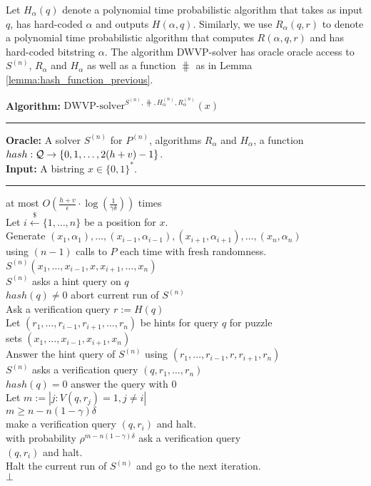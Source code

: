 Let $H_{\alpha}(q)$ denote a polynomial time probabilistic algorithm that takes as input $q$,
has hard-coded $\alpha$ and outputs $H(\alpha, q)$.
Similarly, we use $R_{\alpha}(q,r)$ to denote a polynomial time probabilistic algorithm that computes $R(\alpha, q, r)$ and has hard-coded bitstring $\alpha$.
The algorithm DWVP-solver has oracle oracle access to $S^{(n)}$, $R_{\alpha}$ and $H_{\alpha}$ as well as a function $\hash$ as in Lemma \ref{lemma:hash_function_previous}.
%
\begin{codeblock}
  \textbf{Algorithm:} $\text{DWVP-solver}^{S^{(n)}, \hash, H_{\alpha}^{(n)}, R_{\alpha}^{(n)}}(x)$
  \medskip
  \hrule
  \textbf{Oracle:}  A solver $S^{(n)}$ for $P^{(n)}$, algorithms $R_{\alpha}$ and $H_{\alpha}$, a function $hash : \mathcal{Q} \rightarrow \{0,1, \dotsc, 2(h+v)-1\}$.\\
  \textbf{Input:} A bistring $x \in \{0,1\}^{*}$.
  \medskip\hrule
  \Repeat at most $O(\frac{h+v}{\epsilon} \cdot \log(\frac{1}{\gamma\delta}))$ times \\
  \IndI Let $i \xleftarrow{\$} \{1, \dotsc, n\}$ be a position for $x$.\\
  \IndI Generate $(x_1, \alpha_1), \dotsc, (x_{i-1}, \alpha_{i-1}), (x_{i+1}, \alpha_{i+1}), \dotsc, (x_n, \alpha_n)$ \\
  \IndI using $(n-1)$ calls to $P$ each time with fresh randomness.\\
  \IndI \Run $S^{(n)}(x_1, \dotsc, x_{i-1}, x, x_{i+1}, \dotsc, x_n)$\\
  \IndII \If $S^{(n)}$ asks a hint query on $q$ \Then \\
  \IndIII \If $hash(q) \neq 0$ \Then abort current run of $S^{(n)}$\\
  \IndIII Ask a verification query $r := H(q)$\\
  \IndIII Let $(r_1, \dotsc, r_{i-1}, r_{i+1}, \dotsc, r_{n})$ be hints for query $q$ for puzzle\\
  \IndIII sets $(x_1, \dotsc, x_{i-1}, x_{i+1}, x_n)$\\
  \IndIII Answer the hint query of $S^{(n)}$ using $(r_1, \dots, r_{i-1}, r, r_{i+1}, r_n)$\\
  \IndII \If $S^{(n)}$ asks a verification query $(q, r_1, \dots, r_n)$ \Then \\
  \IndIII \If $hash(q) = 0$ \Then answer the query with $0$\\
  \IndIII Let $m := |j: V(q,r_j) = 1, j \neq i|$\\
  \IndIII \If $m \geq n - n(1-\gamma)\delta$ \Then \\
  \IndIIII make a verification query $(q, r_i)$ and halt.\\
  \IndIII \Else with probability $\rho^{m - n(1-\gamma)\delta}$ ask a verification query \\
  \IndIIII $(q, r_i)$ and halt. \\
  \IndIII Halt the current run of $S^{(n)}$ and go to the next iteration.\\
  \Return $\bot$
\end{codeblock}

